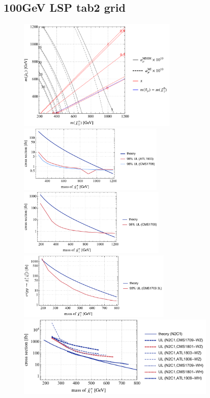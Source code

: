 \documentclass[a4paper,10pt,captions=tableheading,DIV=14]{scrartcl}
\numberwithin{equation}{section}
\begin{document}
\clearpage
\subsection{100GeV LSP tab2 grid}

\begin{figure}[h!]\centering
  \includegraphics[height=150pt]{../plots/plot_spectrum_tab2_physplot.pdf}
  \includegraphics[height=90pt]{../plots/plot_tab2m100x050_limit.pdf}
  \includegraphics[height=90pt]{../plots/plot_tab2m100x005_limit.pdf}
  \includegraphics[height=90pt]{../plots/plot_tab2m100x095_limit21.pdf}
  \includegraphics[height=110pt]{../plots/plot_tab2m100boson_limit.pdf}

\end{figure}
\end{document}

